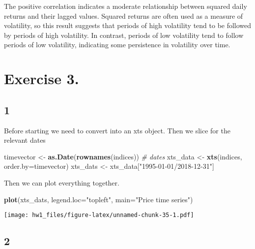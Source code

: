 \documentclass[
]{article}
\newenvironment{Shaded}{\begin{snugshade}}{\end{snugshade}}
\newcommand{\AttributeTok}[1]{\textcolor[rgb]{0.13,0.29,0.53}{#1}}
\newcommand{\CommentTok}[1]{\textcolor[rgb]{0.56,0.35,0.01}{\textit{#1}}}
\newcommand{\FunctionTok}[1]{\textcolor[rgb]{0.13,0.29,0.53}{\textbf{#1}}}
\newcommand{\NormalTok}[1]{#1}
\newcommand{\OtherTok}[1]{\textcolor[rgb]{0.56,0.35,0.01}{#1}}
\newcommand{\StringTok}[1]{\textcolor[rgb]{0.31,0.60,0.02}{#1}}
\begin{document}
The positive correlation indicates a moderate relationship between
squared daily returns and their lagged values. Squared returns are often
used as a measure of volatility, so this result suggests that periods of
high volatility tend to be followed by periods of high volatility. In
contrast, periods of low volatility tend to follow periods of low
volatility, indicating some persistence in volatility over time.

\section{Exercise 3.}\label{exercise-3.}

\subsection{1}\label{section-9}

Before starting we need to convert into an xts object. Then we slice for
the relevant dates

\begin{Shaded}
\begin{Highlighting}[]
\NormalTok{timevector }\OtherTok{\textless{}{-}} \FunctionTok{as.Date}\NormalTok{(}\FunctionTok{rownames}\NormalTok{(indices)) }\CommentTok{\# dates}
\NormalTok{xts\_data }\OtherTok{\textless{}{-}} \FunctionTok{xts}\NormalTok{(indices, }\AttributeTok{order.by=}\NormalTok{timevector)}
\NormalTok{xts\_dats }\OtherTok{\textless{}{-}}\NormalTok{ xts\_data[}\StringTok{"1995{-}01{-}01/2018{-}12{-}31"}\NormalTok{]}
\end{Highlighting}
\end{Shaded}

Then we can plot everything together.

\begin{Shaded}
\begin{Highlighting}[]
\FunctionTok{plot}\NormalTok{(xts\_dats, }\AttributeTok{legend.loc=}\StringTok{"topleft"}\NormalTok{, }\AttributeTok{main=}\StringTok{"Price time series"}\NormalTok{)}
\end{Highlighting}
\end{Shaded}

\texttt{[image: hw1\_files/figure-latex/unnamed-chunk-35-1.pdf]}

\subsection{2}\label{section-10}
\end{document}
